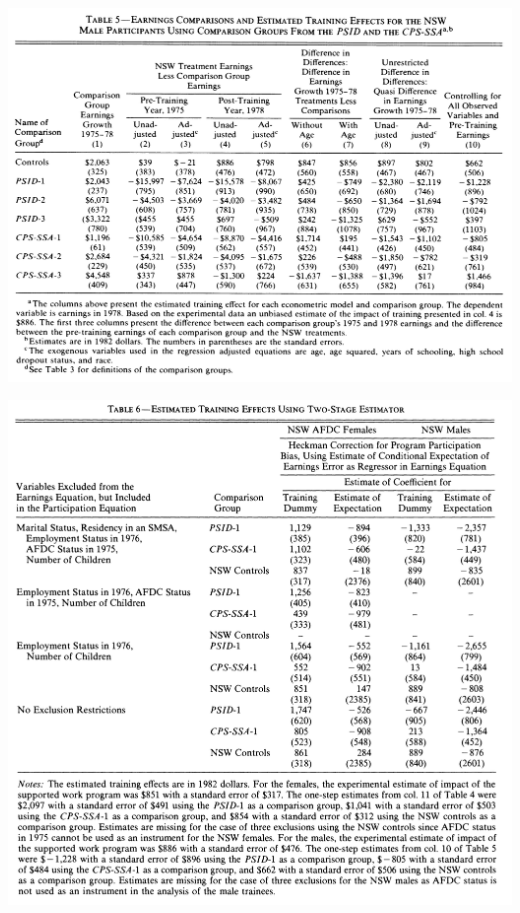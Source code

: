 \documentclass[letterpaper,12pt,leqno]{article}
\newcommand\blankpage{\null\thispagestyle{empty}  \addtocounter{page}{-1}\newpage}
\begin{document}
\begin{table}[!ht]
\includegraphics[scale = 0.4]{LaLonde_table5.png}
\end{table}
\clearpage


\begin{table}[!ht]
\includegraphics[scale = 0.4]{LaLonde_table6.png}
\end{table}

\afterpage{\blankpage}
\clearpage
\end{document}
